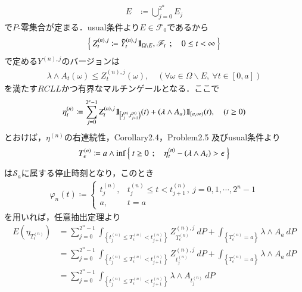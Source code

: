 \begin{prf}
\begin{description}
\begin{align}
					E &\coloneqq \bigcup_{j=0}^{2^n} E_j
				\end{align}
				で$P$-零集合が定まる．usual条件より$E \in \mathscr{F}_0$であるから
				\begin{align}
					\left\{\ Z^{(n),j}_t \coloneqq \tilde{Y}^{(n),j}_t \mbox{1}\hspace{-0.25em}\mbox{l}_{\Omega \backslash E},
					\mathscr{F}_t\ \, ; \quad 0 \leq t < \infty\ \right\}
				\end{align}
				で定める$Y^{(n),j}$のバージョンは
				\begin{align}
					\lambda \wedge A_t(\omega) 
					\leq Z^{(n),j}_t(\omega),
					\quad (\forall \omega \in \Omega \backslash E,\ \forall t \in [0,a])
					\label{eq:chapter_1_theorem_4_14_4}
				\end{align}
				を満たす$RCLL$かつ有界なマルチンゲールとなる．ここで
				\begin{align}
					\eta^{(n)}_t \coloneqq
					\sum_{j=0}^{2^n-1} Z^{(n),j}_t \mbox{1}\hspace{-0.25em}\mbox{l}_{\left[t^{(n)}_j,t^{(n)}_{j+1}\right)}(t)
						+ (\lambda \wedge A_a) \mbox{1}\hspace{-0.25em}\mbox{l}_{[a,\infty)}(t),
					\quad (t \geq 0)
				\end{align}
				とおけば，$\eta^{(n)}$の右連続性，Corollary2.4，Problem2.5 及びusual条件より
				\begin{align}
					T^{(n)}_\epsilon \coloneqq
					a \wedge \operatorname*{inf}_{} \left\{\ t \geq 0\ \, ; \quad \eta^{(n)}_t - (\lambda \wedge A_t) > \epsilon\ \right\}
				\end{align}
				は$\mathscr{S}_a$に属する停止時刻となり，このとき
				\begin{align}
					\varphi_n(t) \coloneqq 
					\begin{cases}
						t^{(n)}_j, & t^{(n)}_j \leq t < t^{(n)}_{j+1},\ j=0,1,\cdots,2^n-1 \\
						a, & t = a
					\end{cases}
				\end{align}
				を用いれば，任意抽出定理より
				\begin{align}
					E\left( \eta_{T^{(n)}_\epsilon} \right)
					&= \sum_{j=0}^{2^n-1} \int_{\left\{t^{(n)}_j \leq T^{(n)}_\epsilon < t^{(n)}_{j+1}\right\}} Z^{(n),j}_{T^{(n)}_\epsilon}\ dP
						+ \int_{\left\{T^{(n)}_\epsilon = a\right\}} \lambda \wedge A_a\ dP \\
					&= \sum_{j=0}^{2^n-1} \int_{\left\{t^{(n)}_j \leq T^{(n)}_\epsilon < t^{(n)}_{j+1}\right\}} Z^{(n),j}_{t^{(n)}_j}\ dP
						+ \int_{\left\{T^{(n)}_\epsilon = a\right\}} \lambda \wedge A_a\ dP \\
					&= \sum_{j=0}^{2^n-1} \int_{\left\{t^{(n)}_j \leq T^{(n)}_\epsilon < t^{(n)}_{j+1}\right\}} \lambda \wedge A_{t^{(n)}_j}\ dP

\end{align}
\end{description}
\end{prf}
